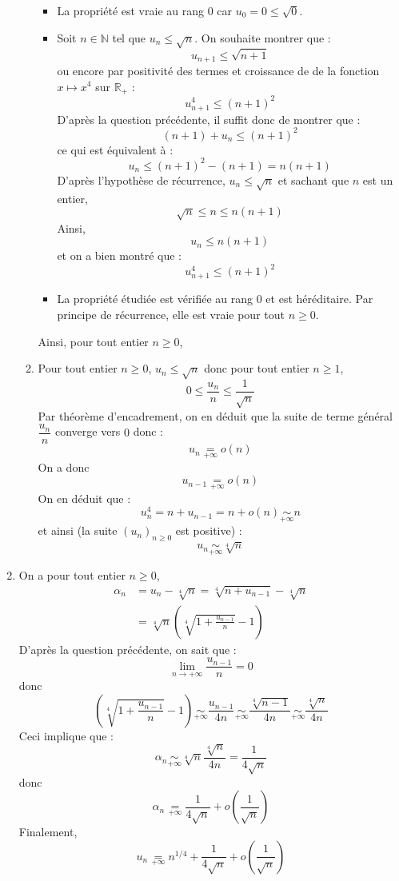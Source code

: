 \documentclass[a4paper,twoside,french,10pt]{VcCours}
\begin{document}
\begin{enumerate}
\begin{enumerate}
\begin{itemize}
\item La propriété est vraie au rang $0$ car $u_0=0 \leq \sqrt{0}$.
\item Soit $n \in \mathbb{N}$ tel que $u_n \leq \sqrt{n}$. On souhaite montrer que :
$$ u_{n+1} \leq \sqrt{n+1}$$
ou encore par positivité des termes et croissance de de la fonction $x \mapsto x^4$ sur $\mathbb{R}_+$ :
$$ u_{n+1}^4 \leq (n+1)^2$$
D'après la question précédente, il suffit donc de montrer que :
$$ (n+1) + u_n \leq (n+1)^2$$
ce qui est équivalent à :
$$ u_n \leq (n+1)^2-(n+1) = n(n+1)$$
D'après l'hypothèse de récurrence, $u_n \leq \sqrt{n}$ et sachant que $n$ est un entier, 
$$\sqrt{n} \leq n \leq n(n+1)$$
Ainsi,
$$ u_n \leq n(n+1)$$
et on a bien montré que :
$$ u_{n+1}^4 \leq (n+1)^2$$
\item La propriété étudiée est vérifiée au rang $0$ et est héréditaire. Par principe de récurrence, elle est vraie pour tout $n \geq 0$. 
\end{itemize}
Ainsi, pour tout entier $n \geq 0$,
\item Pour tout entier $n \geq 0$, $u_n \leq \sqrt{n}$ donc pour tout entier $n \geq 1$,
$$ 0 \leq \dfrac{u_n}{n} \leq \dfrac{1}{\sqrt{n}}$$
Par théorème d'encadrement, on en déduit que la suite de terme général $\dfrac{u_n}{n}$ converge vers $0$ donc :
$$\boxed{u_n\underset{+ \infty}{=}o(n)}$$
On a donc 
$$ u_{n-1} \underset{+ \infty}{=}o(n)$$
On en déduit que :
$$ u_n^4 = n+ u_{n-1} = n+ o(n) \underset{+ \infty}{\sim} n$$
et ainsi (la suite $(u_n)_{n \geq 0}$ est positive) : 
$$ \boxed{u_n \underset{+ \infty}{\sim}\sqrt[4]{n}}$$
\end{enumerate}
\item On a pour tout entier $n \geq 0$,
\begin{align*}
\alpha_n & =u_n-\sqrt[4]{n}=\sqrt[4]{n+u_{n-1}}-\sqrt[4]{n} \\
& =\sqrt[4]{n}\left(\sqrt[4]{1+\frac{u_{n-1}}{n}}-1\right)
\end{align*}
D'après la question précédente, on sait que :
$$\lim_{n\to+\infty}\frac{u_{n-1}}{n}=0$$
donc 
$$\left(\sqrt[4]{1+\frac{u_{n-1}}{n}}-1\right)\mathop{\sim}\limits_{+\infty}\frac{u_{n-1}}{4n}
\mathop{\sim}\limits_{+\infty}\frac{\sqrt[4]{n-1}}{4n}\mathop{\sim}\limits_{+\infty}\frac{\sqrt[4]{n}}{4n}$$
Ceci implique que :
$$\alpha_n\mathop{\sim}\limits_{+\infty}\sqrt[4]{n}\frac{\sqrt[4]{n}}{4n}=\frac{1}{4\sqrt{n}}$$
donc
$$ \alpha_n \underset{+ \infty}{=} \frac{1}{4\sqrt{n}} + o \left( \dfrac{1}{\sqrt{n}} \right)$$
Finalement,
$$\boxed{u_n \underset{+ \infty}{=} n^{1/4}+\frac{1}{4\sqrt{n}}+o\left(\frac{1}{\sqrt{n}}\right) }$$


\end{enumerate}
\end{document}
